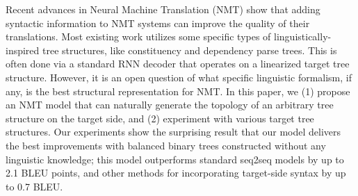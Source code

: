 Recent advances in Neural Machine Translation (NMT) show that adding syntactic information to NMT systems can improve the quality of their translations. Most existing work utilizes some specific types of linguistically-inspired tree structures, like constituency and dependency parse trees. This is often done via a standard RNN decoder that operates on a linearized target tree structure. However, it is an open question of what specific linguistic formalism, if any, is the best structural representation for NMT. In this paper, we (1) propose an NMT model that can naturally generate the topology of an arbitrary tree structure on the target side, and (2) experiment with various target tree structures. Our experiments show the surprising result that our model delivers the best improvements with balanced binary trees constructed without any linguistic knowledge; this model outperforms standard seq2seq models by up to 2.1 BLEU points, and other methods for incorporating target-side syntax by up to 0.7 BLEU.
